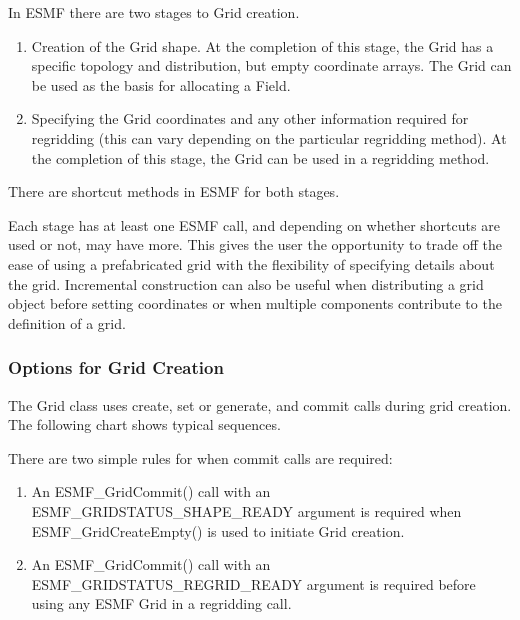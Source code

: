 {In ESMF there are two stages to Grid creation.
\begin{enumerate}
\item Creation of the Grid shape.  At the completion of this
stage, the Grid has a specific topology and distribution, but
empty coordinate arrays.  The Grid can be used as the basis for
allocating a Field.
\item Specifying the Grid coordinates and any other information
required for regridding (this can vary depending on the 
particular regridding method).  At the completion of this
stage, the Grid can be used in a regridding method.
\end{enumerate}
There are shortcut methods in ESMF for both stages.

Each stage has at least one ESMF call, and depending on 
whether shortcuts are used or not, may have more.
This gives the user the opportunity to trade off the 
ease of using a prefabricated grid with the flexibility 
of specifying details about the grid.  Incremental
construction can also be useful when distributing a grid object
before setting coordinates or when multiple components
contribute to the definition of a grid. 

\subsubsection{Options for Grid Creation}

The Grid class uses create, set or generate, and 
commit calls during grid creation.  The following chart
shows typical sequences.

There are two simple rules for when commit calls are required:
\begin{enumerate}
\item An ESMF\_GridCommit() call with an ESMF\_GRIDSTATUS\_SHAPE\_READY
argument is required when ESMF\_GridCreateEmpty() is used to initiate
Grid creation.
\item An ESMF\_GridCommit() call with an ESMF\_GRIDSTATUS\_REGRID\_READY
argument is required before using any ESMF Grid in a regridding call.
\end{enumerate}

}
